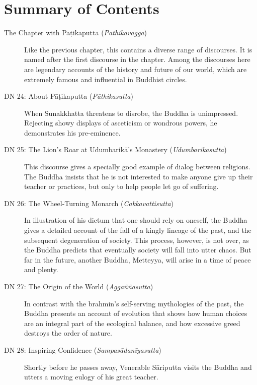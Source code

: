 \documentclass[12pt,openany]{book}%
\begin{document}
\newpage

\setlength{\parindent}{1.5em}%
\tableofcontents
\newpage
\pagestyle{fancy}
%
\chapter*{Summary of Contents}

\begin{description}%
\item[The Chapter with \textsanskrit{Pāṭikaputta} (\textit{\textsanskrit{Pāthikavagga}})] Like the previous chapter, this contains a diverse range of discourses. It is named after the first discourse in the chapter. Among the discourses here are legendary accounts of the history and future of our world, which are extremely famous and influential in Buddhist circles.%
\item[DN 24: About \textsanskrit{Pāṭikaputta} (\textit{\textsanskrit{Pāthikasutta}})] When Sunakkhatta threatens to disrobe, the Buddha is unimpressed. Rejecting showy displays of asceticism or wondrous powers, he demonstrates his pre-eminence.%
\item[DN 25: The Lion’s Roar at \textsanskrit{Udumbarikā}’s Monastery (\textit{\textsanskrit{Udumbarikasutta}})] This discourse gives a specially good example of dialog between religions. The Buddha insists that he is not interested to make anyone give up their teacher or practices, but only to help people let go of suffering.%
\item[DN 26: The Wheel-Turning Monarch (\textit{\textsanskrit{Cakkavattisutta}})] In illustration of his dictum that one should rely on oneself, the Buddha gives a detailed account of the fall of a kingly lineage of the past, and the subsequent degeneration of society. This process, however, is not over, as the Buddha predicts that eventually society will fall into utter chaos. But far in the future, another Buddha, Metteyya, will arise in a time of peace and plenty.%
\item[DN 27: The Origin of the World (\textit{\textsanskrit{Aggaññasutta}})] In contrast with the brahmin’s self-serving mythologies of the past, the Buddha presents an account of evolution that shows how human choices are an integral part of the ecological balance, and how excessive greed destroys the order of nature.%
\item[DN 28: Inspiring Confidence (\textit{\textsanskrit{Sampasādanīyasutta}})] Shortly before he passes away, Venerable \textsanskrit{Sāriputta} visits the Buddha and utters a moving eulogy of his great teacher.%

\end{description}
\end{document}
